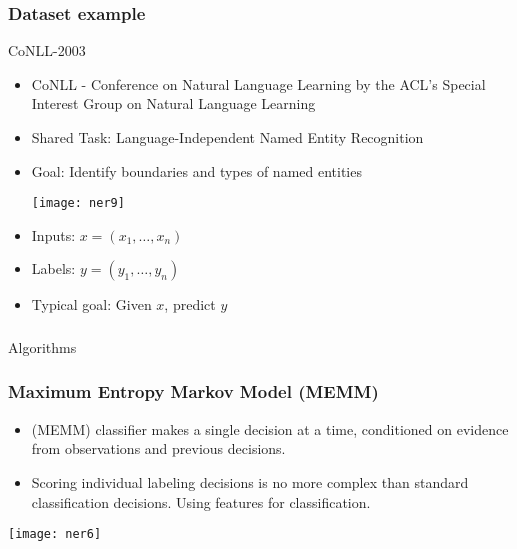 \begin{frame}[fragile]\frametitle{Dataset example}

CoNLL-2003

  \begin{itemize}
  \item CoNLL - Conference on Natural Language Learning by the ACL's Special Interest Group on Natural Language Learning
  \item Shared Task: Language-Independent Named Entity Recognition
  \item Goal: Identify boundaries and types of named entities
\begin{center}
\texttt{[image: ner9]}
\end{center}
\item Inputs: $x = (x_1,\ldots, x_n)$
\item Labels: $y = (y_1,\ldots, y_n)$
\item Typical goal: Given $x$, predict $y$

  \end{itemize}
\end{frame}

\begin{frame}[fragile]\frametitle{}

\begin{center}
{\Large Algorithms}
\end{center}
\end{frame}



\begin{frame}[fragile]\frametitle{Maximum Entropy Markov Model (MEMM)}
  \begin{itemize}
  \item (MEMM) classifier makes a single decision at a time, conditioned on evidence from observations and previous decisions.
  \item Scoring individual labeling decisions is no more complex than standard classification decisions. Using features for classification.
  \end{itemize}
\begin{center}
\texttt{[image: ner6]}
\end{center}
\end{frame}

